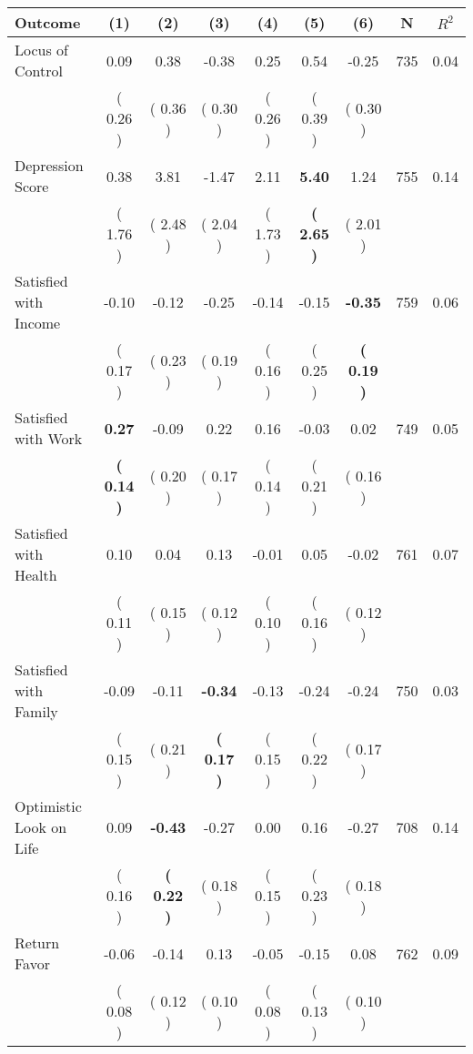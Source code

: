 \begin{tabular}{lcccccccc}
\toprule
 \textbf{Outcome} & \textbf{(1)} & \textbf{(2)} & \textbf{(3)} & \textbf{(4)} & \textbf{(5)} & \textbf{(6)} & \textbf{N} & \textbf{$ R^2$} \\
\midrule
Locus of Control &      0.09 &      0.38 &     -0.38 &      0.25 &      0.54 &     -0.25 & 735 &       0.04 \\ 
 & (     0.26 ) & (     0.36 ) & (     0.30 ) & (     0.26 ) & (     0.39 ) & (     0.30 ) & \\
Depression Score &      0.38 &      3.81 &     -1.47 &      2.11 & \textbf{     5.40} &      1.24 & 755 &       0.14 \\ 
 & (     1.76 ) & (     2.48 ) & (     2.04 ) & (     1.73 ) & \textbf{(     2.65 )} & (     2.01 ) & \\
Satisfied with Income &     -0.10 &     -0.12 &     -0.25 &     -0.14 &     -0.15 & \textbf{    -0.35} & 759 &       0.06 \\ 
 & (     0.17 ) & (     0.23 ) & (     0.19 ) & (     0.16 ) & (     0.25 ) & \textbf{(     0.19 )} & \\
Satisfied with Work & \textbf{     0.27} &     -0.09 &      0.22 &      0.16 &     -0.03 &      0.02 & 749 &       0.05 \\ 
 & \textbf{(     0.14 )} & (     0.20 ) & (     0.17 ) & (     0.14 ) & (     0.21 ) & (     0.16 ) & \\
Satisfied with Health &      0.10 &      0.04 &      0.13 &     -0.01 &      0.05 &     -0.02 & 761 &       0.07 \\ 
 & (     0.11 ) & (     0.15 ) & (     0.12 ) & (     0.10 ) & (     0.16 ) & (     0.12 ) & \\
Satisfied with Family &     -0.09 &     -0.11 & \textbf{    -0.34} &     -0.13 &     -0.24 &     -0.24 & 750 &       0.03 \\ 
 & (     0.15 ) & (     0.21 ) & \textbf{(     0.17 )} & (     0.15 ) & (     0.22 ) & (     0.17 ) & \\
Optimistic Look on Life &      0.09 & \textbf{    -0.43} &     -0.27 &      0.00 &      0.16 &     -0.27 & 708 &       0.14 \\ 
 & (     0.16 ) & \textbf{(     0.22 )} & (     0.18 ) & (     0.15 ) & (     0.23 ) & (     0.18 ) & \\
Return Favor &     -0.06 &     -0.14 &      0.13 &     -0.05 &     -0.15 &      0.08 & 762 &       0.09 \\ 
 & (     0.08 ) & (     0.12 ) & (     0.10 ) & (     0.08 ) & (     0.13 ) & (     0.10 ) & \\

\end{tabular}
